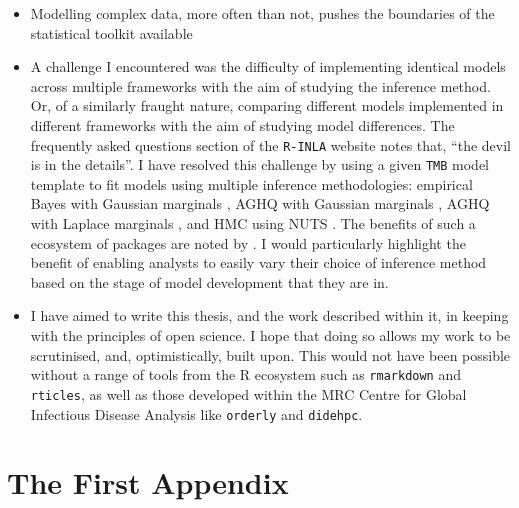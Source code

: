 \documentclass[a4paper, nobind]{templates/ociamthesis}
\providecommand{\tightlist}{%
  \setlength{\itemsep}{0pt}\setlength{\parskip}{0pt}}
\newcommand*{\bibtitle}{Works Cited}
\begin{document}
\begin{itemize}
\tightlist
\item
  Modelling complex data, more often than not, pushes the boundaries of the statistical toolkit available
\item
  A challenge I encountered was the difficulty of implementing identical models across multiple frameworks with the aim of studying the inference method. Or, of a similarly fraught nature, comparing different models implemented in different frameworks with the aim of studying model differences. The frequently asked questions section of the \texttt{R-INLA} website \autocite{rinla2023faq} notes that, ``the devil is in the details''. I have resolved this challenge by using a given \texttt{TMB} model template to fit models using multiple inference methodologies: empirical Bayes with Gaussian marginals \autocite{kristensen2016tmb}, AGHQ with Gaussian marginals \autocite{stringer2021implementing}, AGHQ with Laplace marginals \autocite{howes2023fast}, and HMC using NUTS \autocite{monnahan2018no}. The benefits of such a ecosystem of packages are noted by \textcite{stringer2021fields}. I would particularly highlight the benefit of enabling analysts to easily vary their choice of inference method based on the stage of model development that they are in.
\item
  I have aimed to write this thesis, and the work described within it, in keeping with the principles of open science. I hope that doing so allows my work to be scrutinised, and, optimistically, built upon. This would not have been possible without a range of tools from the R ecosystem such as \texttt{rmarkdown} and \texttt{rticles}, as well as those developed within the MRC Centre for Global Infectious Disease Analysis like \texttt{orderly} and \texttt{didehpc}.
\end{itemize}

\startappendices

\hypertarget{the-first-appendix}{%
\chapter{The First Appendix}\label{the-first-appendix}}




\setlength{\baselineskip}{0pt} %

{\renewcommand*\MakeUppercase[1]{#1}%
\printbibliography[heading=bibintoc,title={\bibtitle}]}
\end{document}
